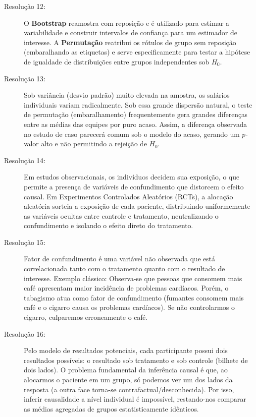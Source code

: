 \documentclass[12pt]{article}
\begin{document}
\begin{description}
    \item[Resolução 12:] O \textbf{Bootstrap} reamostra com reposição e é utilizado para estimar a variabilidade e construir intervalos de confiança para um estimador de interesse. A \textbf{Permutação} reatribui os rótulos de grupo sem reposição (embaralhando as etiquetas) e serve especificamente para testar a hipótese de igualdade de distribuições entre grupos independentes sob $H_0$.

    \item[Resolução 13:] Sob variância (desvio padrão) muito elevada na amostra, os salários individuais variam radicalmente. Sob essa grande dispersão natural, o teste de permutação (embaralhamento) frequentemente gera grandes diferenças entre as médias das equipes por puro acaso. Assim, a diferença observada no estudo de caso parecerá comum sob o modelo do acaso, gerando um $p$-valor alto e não permitindo a rejeição de $H_0$.

    \item[Resolução 14:] Em estudos observacionais, os indivíduos decidem sua exposição, o que permite a presença de variáveis de confundimento que distorcem o efeito causal. Em Experimentos Controlados Aleatórios (RCTs), a alocação aleatória sorteia a exposição de cada paciente, distribuindo uniformemente as variáveis ocultas entre controle e tratamento, neutralizando o confundimento e isolando o efeito direto do tratamento.

    \item[Resolução 15:] Fator de confundimento é uma variável não observada que está correlacionada tanto com o tratamento quanto com o resultado de interesse. Exemplo clássico: Observa-se que pessoas que consomem mais café apresentam maior incidência de problemas cardíacos. Porém, o tabagismo atua como fator de confundimento (fumantes consomem mais café e o cigarro causa os problemas cardíacos). Se não controlarmos o cigarro, culparemos erroneamente o café.

    \item[Resolução 16:] Pelo modelo de resultados potenciais, cada participante possui dois resultados possíveis: o resultado sob tratamento e sob controle (bilhete de dois lados). O problema fundamental da inferência causal é que, ao alocarmos o paciente em um grupo, só podemos ver um dos lados da resposta (a outra face torna-se contrafactual/desconhecida). Por isso, inferir causalidade a nível individual é impossível, restando-nos comparar as médias agregadas de grupos estatisticamente idênticos.


\end{description}
\end{document}
